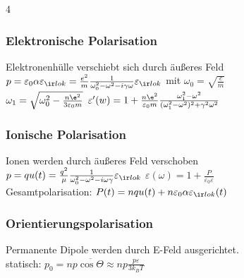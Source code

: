 \documentclass[fs, footer]{latex4ei_custom}
\begin{document}
\begin{multicols*}{4}
{		\subsubsection*{Elektronische Polarisation} Elektronenhülle verschiebt sich durch äußeres Feld\\
		$p = \varepsilon_0\alpha\varepsilon_{\ir lok} = \frac{e^2}{m} \frac{1}{\omega_0^2-\omega^2-i\gamma\omega} \varepsilon_{\ir lok}$ mit $\omega_0 = \sqrt{\frac{c}{m}}$\\
		$\omega_1 = \sqrt{\omega_0^2-\frac{n\e^2}{3\varepsilon_0 m}}$ \qquad $\varepsilon'(w) = 1 + \frac{n\e^2}{\varepsilon_0 m}\frac{\omega_1^2-\omega^2}{(\omega_1^2-\omega^2)^2+\gamma^2\omega^2}$\\



		\subsubsection*{Ionische Polarisation} Ionen werden durch äußeres Feld verschoben\\
		$p = q u(t) = \frac{q^2}{\mu}\frac{1}{\omega_0^2-\omega^2-i\omega\gamma} \varepsilon_{\ir lok}$ \qquad $\varepsilon(\omega) = 1 + \frac{P}{\varepsilon_0\varepsilon}$\\
		Gesamtpolarisation: $P(t) = nqu(t)+n\varepsilon_0\alpha\varepsilon_{\ir lok}(t)$\\
		\subsubsection*{Orientierungspolarisation} Permanente Dipole werden durch E-Feld ausgerichtet.\\
		statisch: $p_0=np\overline{\cos\Theta} \approx np \frac{p\varepsilon}{3k_BT}$
	}



\end{multicols*}
\end{document}
